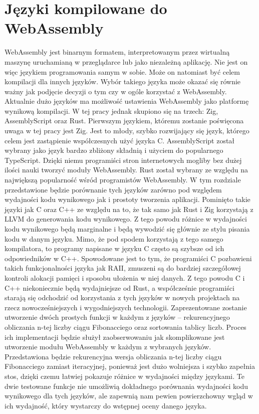 \documentclass[language=polish,type=master]{aghmodern}
\begin{document}
\chapter{Języki kompilowane do WebAssembly}
WebAssembly jest binarnym formatem, interpretowanym przez wirtualną maszynę uruchamianą w przeglądarce lub jako niezależną aplikację.
Nie jest on więc językiem programowania samym w sobie.
Może on natomiast być celem kompilacji dla innych języków.
Wybór takiego języka może okazać się równie ważny jak podjęcie decyzji o tym czy w ogóle korzystać z WebAssembly.
Aktualnie dużo języków ma możliwość ustawienia WebAssembly jako platformę wynikową kompilacji.
W tej pracy jednak skupiono się na trzech: Zig, AssemblyScript oraz Rust.
Pierwszym językiem, któremu zostanie poświęcona uwaga w tej pracy jest Zig.
Jest to młody, szybko rozwijający się język, którego celem jest zastąpienie współczesnych użyć języka C.
AssemblyScript został wybrany jako język bardzo zbliżony składnią i użyciem do popularnego TypeScript.
Dzięki niemu programiści stron internetowych mogliby bez dużej ilości nauki tworzyć moduły WebAssembly.
Rust został wybrany ze względu na największą popularność wśród programistów WebAssembly.
W tym rozdziale przedstawione będzie porównanie tych języków zarówno pod względem wydajności kodu wynikowego jak i prostoty tworzenia aplikacji.
Pominięto takie języki jak C oraz C++ ze względu na to, że tak samo jak Rust i Zig korzystają z LLVM\footnotemark{} do generowania kodu wynikowego.
Z tego powodu różnice w wydajności kodu wynikowego będą marginalne i będą wywodzić się głównie ze stylu pisania kodu w danym języku.
Mimo, że pod spodem korzystają z tego samego kompilatora, to programy napisane w języku C często są szybsze od ich odpowiedników w C++.
Spowodowane jest to tym, że programiści C pozbawieni takich funkcjonalności języka jak RAII\footnotemark{}, zmuszeni są do bardziej szczegółowej kontroli alokacji pamięci i sposobu ułożenia w niej danych.
Z tego powodu C i C++ niekoniecznie będą wydajniejsze od Rust, a współcześnie programiści starają się odchodzić od korzystania z tych języków w nowych projektach na rzecz nowocześniejszych i wygodniejszych technologii.
Zaprezentowane zostanie utworzenie dwóch prostych funkcji w każdym z języków -- rekurencyjnego obliczania n-tej liczby ciągu Fibonacciego oraz sortowania tablicy liczb.
Proces ich implementacji będzie służył zaobserwowaniu jak skomplikowane jest utworzenie modułu WebAssembly w każdym z wybranych języków.
Przedstawiona będzie rekurencyjna wersja obliczania n-tej liczby ciągu Fibonacciego zamiast iteracyjnej, ponieważ jest dużo wolniejsza i szybko zapełnia stos, dzięki czemu łatwiej pokazuje różnice w wydajności między językami.
Te dwie testowane funkcje nie umożliwią dokładnego porównania wydajności kodu wynikowego dla tych języków, ale zapewnią nam pewien powierzchowny wgląd w ich wydajność, który wystarczy do wstępnej oceny danego języka.
\end{document}
